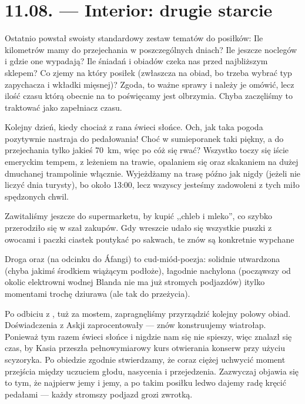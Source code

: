 \chapter*{11.08. --- Interior: drugie starcie}


Ostatnio powstał swoisty standardowy zestaw tematów do posiłków: Ile kilometrów mamy do przejechania w poszczególnych dniach? Ile jeszcze noclegów i gdzie one wypadają? Ile śniadań i obiadów czeka nas przed najbliższym sklepem? Co zjemy na który posiłek (zwłaszcza na obiad, bo trzeba wybrać typ zapychacza i wkładki mięsnej)? Zgoda, to ważne sprawy i należy je omówić, lecz ilość czasu którą obecnie na to poświęcamy jest olbrzymia. Chyba zaczęliśmy to traktować jako zapełniacz czasu.

Kolejny dzień, kiedy chociaż z rana świeci słońce. Och, jak taka pogoda pozytywnie nastraja do pedałowania! Choć w sumie\textellipsis poranek taki piękny, a do przejechania tylko jakieś 70~km, więc po cóż się rwać? Wszystko toczy się iście emeryckim tempem, z leżeniem na trawie, opalaniem się oraz skakaniem na dużej dmuchanej trampolinie włącznie. Wyjeżdżamy na trasę późno jak nigdy (jeżeli nie liczyć dnia turysty), bo około 13:00, lecz wszyscy jesteśmy zadowoleni z tych miło spędzonych chwil.


Zawitaliśmy jeszcze do supermarketu, by kupić ,,chleb i mleko'', co szybko przerodziło się w szał zakupów. Gdy wreszcie udało się wszystkie puszki z owocami i paczki ciastek poutykać po sakwach, te znów są konkretnie wypchane \smile

Droga  oraz  (na odcinku do Áfangi) to cud-miód-poezja: solidnie utwardzona (chyba jakimś środkiem wiążącym podłoże), łagodnie nachylona (począwszy od okolic elektrowni wodnej Blanda nie ma już stromych podjazdów) i\textellipsis tylko momentami trochę dziurawa (ale tak do przeżycia).



Po odbiciu z , tuż za mostem, zapragnęliśmy przyrządzić kolejny polowy obiad. Doświadczenia z Askji zaprocentowały --- znów konstruujemy wiatrołap. Ponieważ tym razem świeci słońce i nigdzie nam się nie spieszy, więc znalazł się czas, by Kasia przeszła pełnowymiarowy kurs otwierania konserw przy użyciu scyzoryka. Po obiedzie zgodnie stwierdzamy, że coraz ciężej uchwycić moment przejścia między uczuciem głodu, nasycenia i przejedzenia. Zazwyczaj objawia się to tym, że najpierw jemy i jemy, a po takim posiłku ledwo dajemy radę kręcić pedałami --- każdy stromszy podjazd grozi zwrotką.

